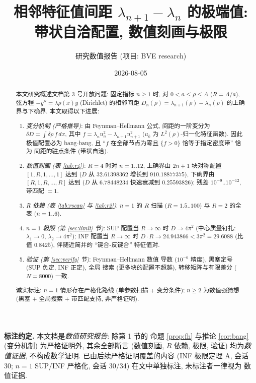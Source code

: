 \documentclass[UTF8]{ctexart}
\title{相邻特征值间距 \texorpdfstring{$\lambda_{n+1}-\lambda_n$}{lambda_{n+1}-lambda_n} 的极端值: 带状自洽配置, 数值刻画与极限}
\author{研究数值报告 (项目: BVE research)}
\date{2026-08-05}
\begin{document}
\maketitle

\begin{abstract}
本文研究概述文档第 3 号开放问题: 固定指标 $n \geq 1$ 时, 对 $0 < a \leq \rho \leq A$
($R = A/a$), 弦方程 $-y'' = \lambda\rho(x)y$ (Dirichlet) 的相邻间距
$D_n(\rho) = \lambda_{n+1}(\rho) - \lambda_n(\rho)$ 的上确界与下确界.
本文取得以下进展:
\begin{enumerate}
	\item \emph{变分机制 (严格推导)}: 由 Feynman--Hellmann 公式,
		间距的一阶变分为 $\delta D = \int \delta\rho\, f\, dx$,
		其中 $f = \lambda_n u_n^2 - \lambda_{n+1}u_{n+1}^2$ ($u_k$ 为
		$L^2(\rho)$-归一化特征函数). 因此极值配置必为 bang-bang, 且
		``$f$ 在全部节点为零且 $\{f>0\}$ 恰等于指定密度带'' 恰为
		间距的驻点条件 (带状自洽).
	\item \emph{数值刻画 (表 \ref{tab:r4})}: $R=4$ 时对 $n = 1..12$,
		上确界由 $2n+1$ 块对称配置 $[1, R, 1, \dots, 1]$ 达到
		($D$ 从 $32.61398362$ 增长到 $910.18877375$), 下确界由
		$[R, 1, R, \dots, R]$ 达到 ($D$ 从 $6.78448234$ 快速衰减到
		$0.25593826$); 残差 $10^{-9}..10^{-12}$, 带匹配 $= 1$.
	\item \emph{R 依赖 (表 \ref{tab:rscan} 与 \ref{tab:r2})}: $n=1$ 的
		$R$ 扫描 ($R=1.5..100$) 与 $R=2$ 的全表 ($n=1..6$).
	\item \emph{$n=1$ 极限 (第 \ref{sec:limit} 节)}: SUP 配置当 $R\to\infty$
		时 $D \to 4\pi^2$ (中心质量钉扎: $\lambda_1 \to 0$,
		$\lambda_2 \to 4\pi^2$); INF 配置当 $R\to\infty$ 时
		$D\cdot R \to 24.943866 < 3\pi^2 = 29.6088$ (比值 $0.8425$),
		伴随近简并的 ``键合-反键合'' 特征值对.
	\item \emph{验证 (第 \ref{sec:verify} 节)}: Feynman--Hellmann 数值
		导数 ($10^{-6}$ 精度), 黑塞定号 (SUP 负定, INF 正定), 全局
		搜索 (更多块的配置不超越), 转移矩阵与有限差分 ($N=8000$) 一致.
\end{enumerate}
诚实标注: $n = 1$ 情形存在严格化路线 (单参数扫描 + 变分条件);
$n \geq 2$ 为数值强猜想 (黑塞 + 全局搜索 + 带匹配支持, 非严格证明).
\end{abstract}

\medskip
\noindent\textbf{标注约定.} 本文档是\emph{数值研究报告}: 除第 1 节的
命题 \ref{prop:fh} 与推论 \ref{cor:bang} (变分机制) 为严格证明外,
其余全部断言 (数值刻画, $R$ 依赖, 极限, 验证) 均为\emph{数值证据},
不构成数学证明. 已由后续严格证明覆盖的内容 (INF 极限定理 A, 会话 30;
$n=1$ SUP/INF 严格化, 会话 30/34) 在文中单独标注, 未标注者一律视为
数值证据.
\end{document}
